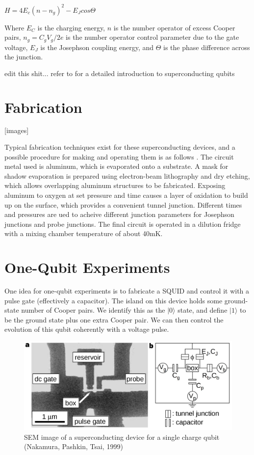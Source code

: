 \documentclass[12pt,letterpaper,notitlepage]{report}
\begin{document}
$H=4E_c(n-n_g)^2-E_Jcos\Theta$

Where $E_C$ is the charging energy, $n$ is the number operator of excess Cooper pairs, $n_g=C_gV_g/2e$ is the number operator control parameter due to the gate voltage, $E_J$ is the Josephson coupling energy, and $\Theta$ is the phase difference across the junction.

edit this shit... refer to \cite{reviewPaper} for a detailed introduction to superconducting qubits

%
%

\section*{Fabrication}

[images]

Typical fabrication techniques exist for these superconducting devices, and a possible procedure for making and operating them is as follows \cite{onePulseGatePhysica}. The circuit metal used is aluminum, which is evaporated onto a substrate. A mask for shadow evaporation is prepared using electron-beam lithography and dry etching, which allows overlapping aluminum structures to be fabricated. Exposing aluminum to oxygen at set pressure and time causes a layer of oxidation to build up on the surface, which provides a convenient tunnel junction. Different times and pressures are ued to acheive different junction parameters for Josephson junctions and probe junctions. The final circuit is operated in a dilution fridge with a mixing chamber temperature of about 40mK.

%
%

\section*{One-Qubit Experiments}

One idea for one-qubit experiments is to fabricate a SQUID and control it with a pulse gate (effectively a capacitor). The island on this device holds some ground-state number of Cooper pairs. We identify this as the $|0\rangle$ state, and define $|1\rangle$ to be the ground state plus one extra Cooper pair. We can then control the evolution of this qubit coherently with a voltage pulse.

\begin{figure}[ht]
    \centering
    \includegraphics[width=\textwidth]{img/nakamura-single-cpb.jpg}
    \caption{SEM image of a superconducting device for a single charge qubit (Nakamura, Pashkin, Tsai, 1999) \cite{singleCPB}}
\end{figure}
\end{document}
